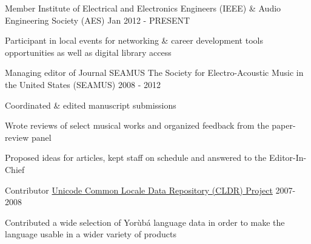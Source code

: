 

\begin{cventries}

  \cventry
    {Member} %
    {Institute of Electrical and Electronics Engineers (IEEE) \& Audio Engineering Society (AES)} %
    {} %
    {Jan 2012 - PRESENT} %
    {
      \begin{cvitems} %
        \item {Participant in local events for networking \& career development tools opportunities as well as digital library access}
      \end{cvitems}
    }

  \cventry
    {Managing editor of Journal SEAMUS} %
    {The Society for Electro-Acoustic Music in the United States (SEAMUS)} %
    {} %
    {2008 - 2012} %
    {
      \begin{cvitems} %
        \item {Coordinated \& edited manuscript submissions}
        \item {Wrote reviews of select musical works and organized feedback from the paper-review panel}
        \item {Proposed ideas for articles, kept staff on schedule and answered to the Editor-In-Chief}
      \end{cvitems}
    }

  \cventry
    {Contributor} %
    {\href{http://cldr.unicode.org/}{Unicode Common Locale Data Repository (CLDR) Project}} %
    {} %
    {2007-2008} %
    {
      \begin{cvitems} %
        \item {Contributed a wide selection of Yor{\`u}b{\'a} language data in order to make the language usable in a wider variety of products}
      \end{cvitems}
    }



\end{cventries}
